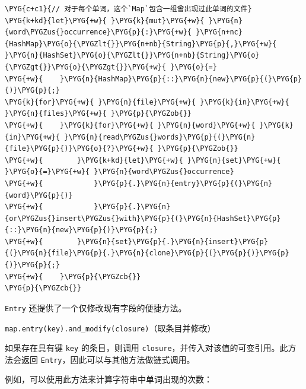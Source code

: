 \begin{Verbatim}[commandchars=\\\{\},breaklines=true,breakanywhere=true,fontsize=\codefont,xleftmargin=17bp]
\PYG{c+c1}{// 对于每个单词，这个`Map`包含一组曾出现过此单词的文件}
\PYG{k+kd}{let}\PYG{+w}{ }\PYG{k}{mut}\PYG{+w}{ }\PYG{n}{word\PYGZus{}occurrence}\PYG{p}{:}\PYG{+w}{ }\PYG{n+nc}{HashMap}\PYG{o}{\PYGZlt{}}\PYG{n+nb}{String}\PYG{p}{,}\PYG{+w}{ }\PYG{n}{HashSet}\PYG{o}{\PYGZlt{}}\PYG{n+nb}{String}\PYG{o}{\PYGZgt{}}\PYG{o}{\PYGZgt{}}\PYG{+w}{ }\PYG{o}{=}
\PYG{+w}{    }\PYG{n}{HashMap}\PYG{p}{::}\PYG{n}{new}\PYG{p}{(}\PYG{p}{)}\PYG{p}{;}
\PYG{k}{for}\PYG{+w}{ }\PYG{n}{file}\PYG{+w}{ }\PYG{k}{in}\PYG{+w}{ }\PYG{n}{files}\PYG{+w}{ }\PYG{p}{\PYGZob{}}
\PYG{+w}{    }\PYG{k}{for}\PYG{+w}{ }\PYG{n}{word}\PYG{+w}{ }\PYG{k}{in}\PYG{+w}{ }\PYG{n}{read\PYGZus{}words}\PYG{p}{(}\PYG{n}{file}\PYG{p}{)}\PYG{o}{?}\PYG{+w}{ }\PYG{p}{\PYGZob{}}
\PYG{+w}{        }\PYG{k+kd}{let}\PYG{+w}{ }\PYG{n}{set}\PYG{+w}{ }\PYG{o}{=}\PYG{+w}{ }\PYG{n}{word\PYGZus{}occurrence}
\PYG{+w}{            }\PYG{p}{.}\PYG{n}{entry}\PYG{p}{(}\PYG{n}{word}\PYG{p}{)}
\PYG{+w}{            }\PYG{p}{.}\PYG{n}{or\PYGZus{}insert\PYGZus{}with}\PYG{p}{(}\PYG{n}{HashSet}\PYG{p}{::}\PYG{n}{new}\PYG{p}{)}\PYG{p}{;}
\PYG{+w}{        }\PYG{n}{set}\PYG{p}{.}\PYG{n}{insert}\PYG{p}{(}\PYG{n}{file}\PYG{p}{.}\PYG{n}{clone}\PYG{p}{(}\PYG{p}{)}\PYG{p}{)}\PYG{p}{;}
\PYG{+w}{    }\PYG{p}{\PYGZcb{}}
\PYG{p}{\PYGZcb{}}
\end{Verbatim}

\texttt{Entry} 还提供了一个仅修改现有字段的便捷方法。

\begin{myNote}
\texttt{map.entry(key).and\_modify(closure)}（取条目并修改）
\end{myNote}

如果存在具有键 \texttt{key} 的条目，则调用 \texttt{closure}，并传入对该值的可变引用。此方法会返回 \texttt{Entry}，因此可以与其他方法做链式调用。

例如，可以使用此方法来计算字符串中单词出现的次数：


